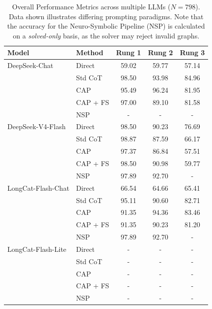 \documentclass{article}
\theoremstyle{plain}
\theoremstyle{definition}
\theoremstyle{remark}
\begin{document}
\begin{table}[t]
\begin{minipage}[t]{0.45\textwidth}
\begin{footnotesize}
      \caption{Overall Performance Metrics across multiple LLMs ($N=798$). Data shown illustrates differing prompting paradigms. Note that the accuracy for the Neuro-Symbolic Pipeline (NSP) is calculated on a \textit{solved-only} basis, as the solver may reject invalid graphs.}
      \label{tab:main_results}
      \end{footnotesize}
  \end{minipage}
  \hfill %
  \begin{minipage}[t]{0.45\textwidth}
    \centering
    \begin{footnotesize}
    \setlength{\tabcolsep}{3pt}
      \begin{tabular}{llccc}
        \toprule
        Model & Method & Rung 1 & Rung 2 & Rung 3 \\
        \midrule
        DeepSeek-Chat & Direct & 59.02 & 59.77 & 57.14 \\
         & Std CoT & 98.50 & 93.98 & 84.96 \\
         & CAP & 95.49 & 96.24 & 81.95 \\
         & CAP + FS & 97.00 & 89.10 & 81.58 \\
         & NSP & - & - & - \\
        \midrule
        DeepSeek-V4-Flash & Direct & 98.50 & 90.23 & 76.69 \\
         & Std CoT & 98.87 & 87.59 & 66.17 \\
         & CAP & 97.37 & 86.84 & 57.51 \\
         & CAP + FS & 98.50 & 90.98 & 59.77 \\
         & NSP & 97.89 & 92.70 & - \\
        \midrule
        LongCat-Flash-Chat & Direct & 66.54 & 64.66 & 65.41 \\
         & Std CoT & 95.11 & 90.60 & 82.71 \\
         & CAP & 91.35 & 94.36 & 83.46 \\
         & CAP + FS & 91.35 & 90.23 & 81.20 \\
         & NSP & 97.89 & 92.70 & - \\
        \midrule
        LongCat-Flash-Lite & Direct & - & - & - \\
         & Std CoT & - & - & - \\
         & CAP & - & - & - \\
         & CAP + FS & - & - & - \\
         & NSP & - & - & - \\

\end{tabular}
\end{footnotesize}
\end{minipage}
\end{table}
\end{document}
